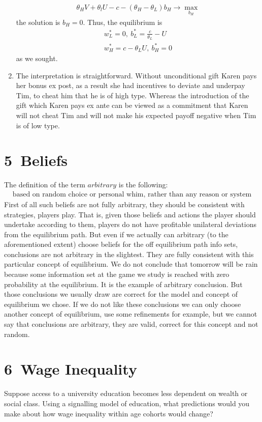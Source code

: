 \documentclass[a4paper]{article}
\begin{document}
\begin{enumerate}
\begin{align*}
	\theta_H V + \theta_l U - c - (\theta_H - \theta_L)b_H \to \underset{b_H}{\max}
	\end{align*}
	the solution is $b_H = 0$. Thus, the equilibrium is
	\begin{align*}
	w^*_L = 0,\ b^*_L = \frac{c}{\theta_L} - U\\
	w^*_H = c - \theta_LU,\ b^*_H = 0
	\end{align*}
	as we sought.
	\item The interpretation is straightforward. Without unconditional gift Karen pays her bonus ex post, as a result she had incentives to deviate and underpay Tim, to cheat him that he is of high type. Whereas the introduction of the gift which Karen pays ex ante can be viewed as a commitment that Karen will not cheat Tim and will not make his expected payoff negative when Tim is of low type.
\end{enumerate}
\section*{5\ Beliefs}
The definition of the term $arbitrary$ is the following:
\begin{align*}
\text{based on random choice or personal whim, rather than any reason or system}
\end{align*}First of all such beliefs are not fully arbitrary, they should be consistent with strategies, players play. That is, given those beliefs and actions the player should undertake according to them, players do not have profitable unilateral deviations from the equilibrium path. But even if we actually can arbitrary (to the aforementioned extent) choose beliefs for the off equilibrium path info sets, conclusions are not arbitrary in the slightest. They are fully consistent with this particular concept of equilibrium. We do not conclude that tomorrow will be rain because some information set at the game we study is reached with zero probability at the equilibrium. It is the example of arbitrary conclusion. But those conclusions we usually draw are correct for the model and concept of equilibrium we chose. If we do not like these conclusions we can only choose another concept of equilibrium, use some refinements for example, but we cannot say that conclusions are arbitrary, they are valid, correct for this concept and not random.
\section*{6\ Wage Inequality}
Suppose access to a university education becomes less dependent on wealth or social class.
Using a signalling model of education, what predictions would you make about how wage
inequality within age cohorts would change?
\end{document}
